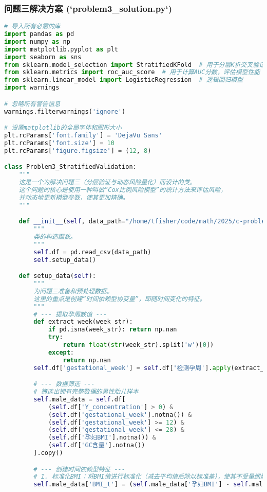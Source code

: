 \documentclass[UTF8, a4paper, 11pt]{ctexart}
\begin{document}
\subsubsection{问题三解决方案 (`problem3_solution.py`)}
\begin{lstlisting}[language=Python, caption={问题三的解决方案脚本。}]
# 导入所有必需的库
import pandas as pd
import numpy as np
import matplotlib.pyplot as plt
import seaborn as sns
from sklearn.model_selection import StratifiedKFold  # 用于分层K折交叉验证
from sklearn.metrics import roc_auc_score  # 用于计算AUC分数，评估模型性能
from sklearn.linear_model import LogisticRegression  # 逻辑回归模型
import warnings

# 忽略所有警告信息
warnings.filterwarnings('ignore')

# 设置matplotlib的全局字体和图形大小
plt.rcParams['font.family'] = 'DejaVu Sans'
plt.rcParams['font.size'] = 10
plt.rcParams['figure.figsize'] = (12, 8)

class Problem3_StratifiedValidation:
    """
    这是一个为解决问题三（分层验证与动态风险量化）而设计的类。
    这个问题的核心是使用一种叫做“Cox比例风险模型”的统计方法来评估风险，
    并动态地更新模型参数，使其更加精确。
    """

    def __init__(self, data_path="/home/tfisher/code/math/2025/c-problem/new-plan/processed_data.csv"):
        """
        类的构造函数。
        """
        self.df = pd.read_csv(data_path)
        self.setup_data()

    def setup_data(self):
        """
        为问题三准备和预处理数据。
        这里的重点是创建“时间依赖型协变量”，即随时间变化的特征。
        """
        # --- 提取孕周数值 ---
        def extract_week(week_str):
            if pd.isna(week_str): return np.nan
            try:
                return float(str(week_str).split('w')[0])
            except:
                return np.nan
        self.df['gestational_week'] = self.df['检测孕周'].apply(extract_week)

        # --- 数据筛选 ---
        # 筛选出拥有完整数据的男性胎儿样本
        self.male_data = self.df[
            (self.df['Y_concentration'] > 0) &
            (self.df['gestational_week'].notna()) &
            (self.df['gestational_week'] >= 12) &
            (self.df['gestational_week'] <= 28) &
            (self.df['孕妇BMI'].notna()) &
            (self.df['GC含量'].notna())
        ].copy()

        # --- 创建时间依赖型特征 ---
        # 1. 标准化BMI：将BMI值进行标准化（减去平均值后除以标准差），使其不受量纲影响
        self.male_data['BMI_t'] = (self.male_data['孕妇BMI'] - self.male_data['孕妇BMI'].mean()) / self.male_data['孕妇BMI'].std()


\end{lstlisting}
\end{document}
